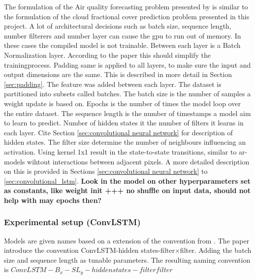 The formulation of the Air quality forecasting problem presented by  \citeauthor{SunAirLSTM} is similar to the formulation of the cloud fractional cover prediction problem presented in this project. %
A lot of architectural decisions such as batch size, sequence length, number filterers and number layer can cause the \acrshort{gpu} to run out of memory. In these cases the compiled model is not trainable. Between each layer is a Batch Normalization layer. According to the paper  this should simplify the trainingprocess. Padding same is applied to all layers, to make sure the input and output dimensions are the same. This is described in more detail in Section \ref{sec:padding}. The feature was added between each layer. The dataset is partitioned into subsets called batches. The batch size is the number of samples a weight update is based on. Epochs is the number of times the model loop over the entire dataset. The sequence length is the number of timestamps a model aim to learn to predict. Number of hidden states it the number of filters it learns in each layer. Cite Section \ref{sec:convolutional neural network} for description of hidden states. 
The filter size determine the number of neighbours influencing an activation. Using kernel 1x1 result in the state-to-state transitions, similar to \acrshort{ar}-models wihtout interactions between adjacent pixels. A more detailed description on this is provided in Sections \ref{sec:convolutional neural network} to \ref{sec:convolutional_lstm}. \textbf{Look in the model on other hyperparameters set as constants, like weight init +++ no shuffle on input data, should not help with may epochs then?}

\subsubsection{Experimental setup (ConvLSTM)}
Models are given names based on a extension of the convention from . The paper introduce the convention ConvLSTM-hidden states-filter$\times$filter. Adding the batch size and sequence length as tunable parameters. The resulting naming convention is \newline $ConvLSTM-B_{x}-SL_{y}-hidden states-filter$\times$filter$

